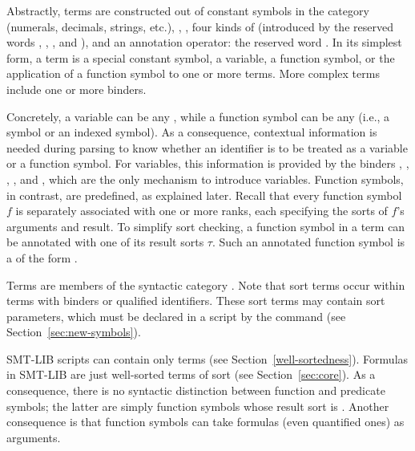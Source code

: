 Abstractly, terms are constructed out of 
constant symbols in the  category
(numerals, decimals, strings, etc.),
, 
, 
four kinds of  
(introduced by the reserved words  , , , and ),
and an annotation operator: the reserved word \ter{!}.
In its simplest form, a term is 
a special constant symbol,
a variable,
a function symbol,
or the application of a function symbol to one or more terms.
More complex terms include one or more binders.

Concretely, a variable can be any ,
while a function symbol can be any 
(i.e., a symbol or an indexed symbol).
As a consequence, contextual information is needed during parsing
to know whether an identifier is to be treated as a variable or 
a function symbol. 
For variables, this information is provided by the binders 
, , , , and , 
which are the only mechanism to introduce variables.
Function symbols, in contrast, are predefined, as explained later.
Recall that every function symbol $f$ is separately associated 
with one or more ranks,
each specifying the sorts of $f$'s arguments and result.
To simplify sort checking,
a function symbol in a term can be annotated with one of its result sorts $\tau$.
Such an annotated function symbol is a 
of the form .
\bigskip

\cTerms
\bigskip

\begin{newver}
Terms are members of the syntactic category .
Note that sort terms occur within terms with binders or qualified identifiers.
These sort terms may contain sort parameters, 
which must be declared in a script by the command 
(see Section~\ref{sec:new-symbols}).
\end{newver}



SMT-LIB scripts can contain only  terms
(see Section~\ref{well-sortedness}).
Formulas in SMT-LIB are just well-sorted terms of sort 
 (see Section~\ref{sec:core}).
As a consequence, there is no syntactic distinction 
between function and predicate symbols;
the latter are simply function symbols whose result sort is .
Another consequence is that function symbols can take formulas 
(even quantified ones) as arguments.

